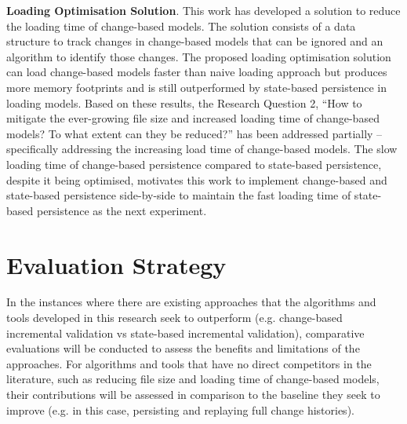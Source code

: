 \documentclass[12pt, a4paper]{report} \usepackage[titletoc]{appendix}
\begin{document}
\textbf{Loading Optimisation Solution}. This work has developed a solution to reduce the loading time of change-based models. The solution consists of a data structure to track changes in change-based models that can be ignored and an algorithm to identify those changes. The proposed loading optimisation solution can load change-based models faster than naive loading approach but produces more memory footprints and is still outperformed by state-based persistence in loading models. Based on these results, the Research Question 2, ``How to mitigate the ever-growing file size and increased loading time of change-based models? To what extent can they be reduced?'' has been addressed partially -- specifically addressing the increasing load time of change-based models. The slow loading time of change-based persistence compared to state-based persistence, despite it being optimised, motivates this work to implement change-based and state-based persistence side-by-side to maintain the fast loading time of state-based persistence as the next experiment.

\section{Evaluation Strategy}
\label{sec:evaluation_strategy}
In the instances where there are existing approaches that the algorithms and tools developed in this research seek to outperform (e.g. change-based incremental validation vs state-based incremental validation), comparative evaluations will be conducted to assess the benefits and limitations of the approaches. For algorithms and tools that have no direct competitors in the literature, such as reducing file size and loading time of change-based models, their contributions will be assessed in comparison to the baseline they seek to improve (e.g. in this case, persisting and replaying full change histories).  
\end{document}
